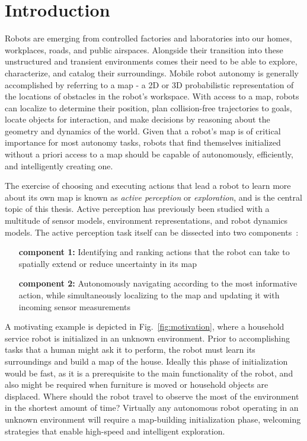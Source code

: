\chapter{Introduction}
\label{chapter1}

Robots are emerging from controlled factories and
laboratories into our homes, workplaces, roads, and public airspaces.
Alongside their transition into these unstructured and transient environments
comes their need to be able to explore, characterize, and catalog their surroundings.
Mobile robot autonomy is generally accomplished by referring to a map - a 2D or 3D
probabilistic representation of the locations of obstacles in the robot's workspace.
With access to a map, robots can localize to determine their position, plan collision-free
trajectories to goals, locate objects for interaction, and make decisions by
reasoning about the geometry and dynamics of the world. Given that a robot's map
is of critical importance for most autonomy tasks, robots that find
themselves initialized without a priori access to a map should be capable of
autonomously, efficiently, and intelligently creating one.

The exercise of choosing and executing actions that lead a robot to learn more about its own
map is known as \textit{active perception} or \textit{exploration}, and
is the central topic of this thesis. Active perception has previously been studied with a
multitude of sensor models, environment representations, and robot dynamics
models. The active perception task itself can be dissected into two
components~\cite{shen20113d}:

\begin{enumerate}[leftmargin=3.2cm]
  \item[\bf component 1:] Identifying and ranking actions that the robot can
    take to spatially extend or reduce uncertainty in its map
  \item[\bf component 2:] Autonomously navigating according to the most informative
    action, while simultaneously localizing to the map and updating it with incoming sensor
    measurements
\end{enumerate}

A motivating example is depicted in Fig.~\ref{fig:motivation}, where a household
service robot is initialized in an unknown environment. Prior to accomplishing
tasks that a human might ask it to perform, the robot must learn its
surroundings and build a map of the house. Ideally this phase of
initialization would be fast, as it is a prerequisite to the main functionality
of the robot, and also might be required when furniture is moved or
household objects are displaced. Where should the robot travel to observe the
most of the environment in the shortest amount of time? Virtually any autonomous robot
operating in an unknown environment will require a map-building
initialization phase, welcoming strategies that enable high-speed and intelligent
exploration.

